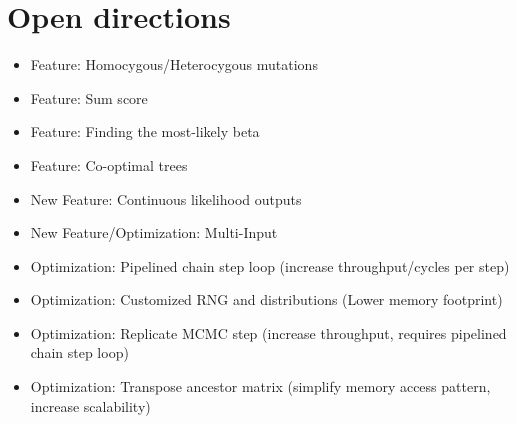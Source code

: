 \section{Open directions}
\label{sec:open_directions}


\begin{itemize}
    \item Feature: Homocygous/Heterocygous mutations
    \item Feature: Sum score
    \item Feature: Finding the most-likely beta
    \item Feature: Co-optimal trees
    \item New Feature: Continuous likelihood outputs
    \item New Feature/Optimization: Multi-Input
    \item Optimization: Pipelined chain step loop (increase throughput/cycles per step)
    \item Optimization: Customized RNG and distributions (Lower memory footprint)
    \item Optimization: Replicate MCMC step (increase throughput, requires pipelined chain step loop)
    \item Optimization: Transpose ancestor matrix (simplify memory access pattern, increase scalability)
\end{itemize}